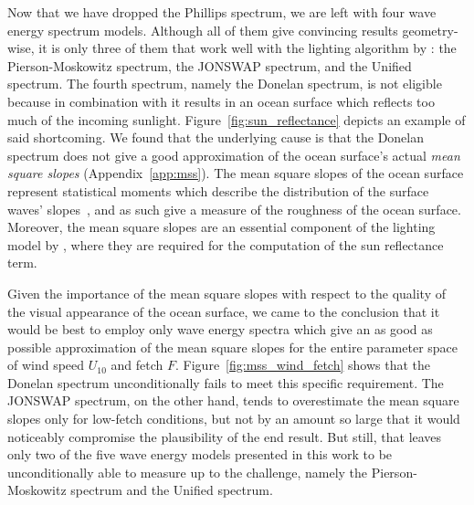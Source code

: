 %
Now that we have dropped the Phillips spectrum, we are left with four wave energy
spectrum models. Although all of them give convincing results geometry-wise,
it is only three of them that work well with the lighting algorithm by
\cite{article:oceanlighting}: the Pierson-Moskowitz spectrum, the JONSWAP
spectrum, and the Unified spectrum. The fourth spectrum, namely the Donelan
spectrum, is not eligible because in combination with \cite{article:oceanlighting}
it results in an ocean surface which reflects too much of the incoming sunlight.
Figure~\ref{fig:sun_reflectance} depicts an example of said shortcoming.
We found that the underlying cause is that the Donelan spectrum does not give
a good approximation of the ocean surface's actual \emph{mean square slopes}
(Appendix~\ref{app:mss}).
The mean square slopes of the ocean surface represent statistical moments
which describe the distribution of the surface waves' slopes~\citep{Massel:2011},
and as such give a measure of the roughness of the ocean surface.
Moreover, the mean square slopes are an essential component of the
lighting model by \cite{article:oceanlighting}, where they are required for
the computation of the sun reflectance term.

Given the importance of the mean square slopes with respect to the
quality of the visual appearance of the ocean surface, we came to
the conclusion that it would be best to employ only wave energy
spectra which give an as good as possible approximation of the mean
square slopes for the entire parameter space of wind speed $U_{10}$
and fetch $F$.
Figure~\ref{fig:mss_wind_fetch} shows that the Donelan spectrum
unconditionally fails to meet this specific requirement. The JONSWAP
spectrum, on the other hand, tends to overestimate the mean square slopes
only for low-fetch conditions, but not by an amount so large that it
would noticeably compromise the plausibility of the end result.
But still, that leaves only two of the five wave energy models presented
in this work to be unconditionally able to measure up to the challenge,
namely the Pierson-Moskowitz spectrum and the Unified spectrum.


